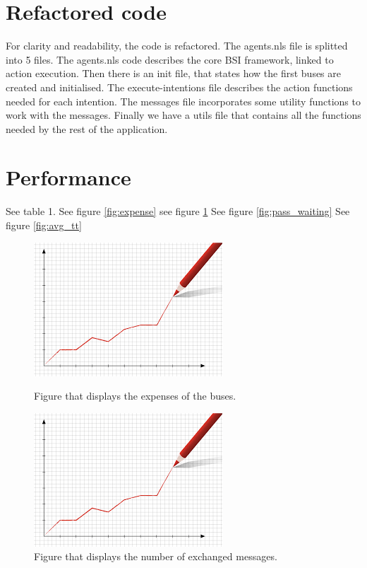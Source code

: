 \documentclass{article}
\begin{document}
\section{Refactored code}
For clarity and readability, the code is refactored. The agents.nls file is splitted into 5 files. The agents.nls code describes the core BSI framework, linked to action execution. Then there is an init file, that states how the first buses are created and initialised. The execute-intentions file describes the action functions needed for each intention. The messages file incorporates some utility functions to work with the messages. Finally we have a utils file that contains all the functions needed by the rest of the application. 

\section{Performance}
See table 1.
See figure \ref{fig:expense}
see figure \ref{fig:messages}
See figure \ref{fig:pass_waiting}
See figure \ref{fig:avg_tt}

\begin{figure}
\centering
\begin{minipage}{.5\textwidth}
  \includegraphics[width=.4\textwidth]{expenses.jpg}
  \caption{\label{fig:expense}Figure that displays the expenses of the buses.}
\end{minipage}%
\begin{minipage}{.5\textwidth}
  \includegraphics[width=.4\textwidth]{nr_messages.jpg}
  \caption{\label{fig:messages}Figure that displays the number of exchanged messages.}
\end{minipage}
\end{figure}
\end{document}
